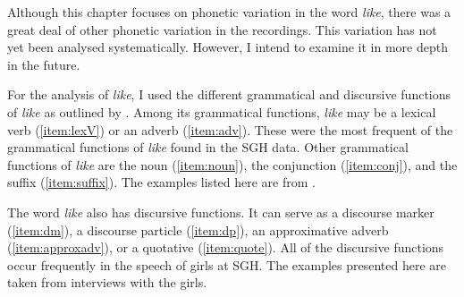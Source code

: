 Although this chapter focuses on phonetic variation in the word \textit{like}, there was a great deal of other phonetic variation in the recordings. This variation has not yet been analysed systematically. However, I intend to examine it in more depth in the future. 

For the analysis of \textit{like}, I used the different grammatical and discursive functions of \textit{like} as outlined by \citet{darcy2007}. Among its grammatical functions, \textit{like} may be a lexical verb (\ref{item:lexV}) or an adverb (\ref{item:adv}). These were the most frequent of the grammatical functions of \textit{like} found in the SGH data. Other grammatical functions of \textit{like} are the noun (\ref{item:noun}), the conjunction (\ref{item:conj}), and the suffix (\ref{item:suffix}). The examples listed here are from \citet{darcy2007}.



\noindent The word \textit{like} also has discursive functions. It can serve as a discourse marker (\ref{item:dm}), a discourse particle (\ref{item:dp}), an approximative adverb (\ref{item:approxadv}), or a quotative (\ref{item:quote}). All of the discursive functions occur frequently in the speech of girls at SGH. The examples presented here are taken from interviews with the girls.


